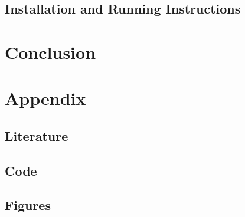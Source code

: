 \documentclass{article}
\begin{document}
\subsection{Installation and Running Instructions}
\section{Conclusion}
\section{Appendix}
\subsection{Literature}
\subsection{Code}
\subsection{Figures}
\end{document}
